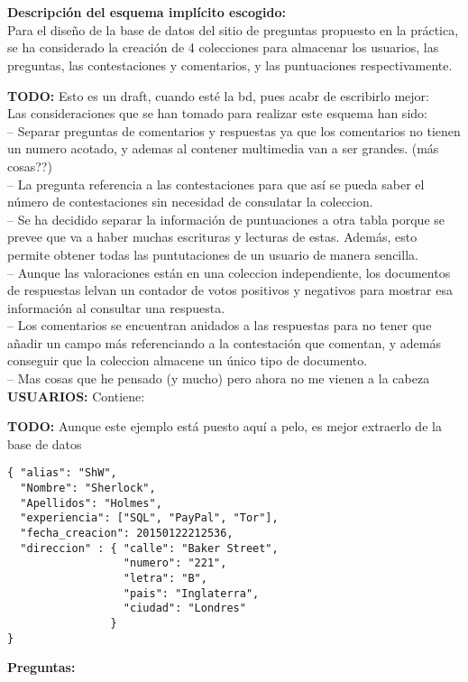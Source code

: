 \documentclass[11pt,a4paper]{article}
\newcommand{\todo}[1]{{\large \color{red} \textbf{TODO: }#1 }}
\begin{document}
 
\pagestyle{fancy}
\fancyhf{}
\rfoot{\thepage\ / \pageref{LastPage}}
\renewcommand{\headrulewidth}{0.4pt}
\renewcommand{\footrulewidth}{0.4pt}
\section*{}

\textbf{Descripción del esquema implícito escogido:}\\

Para el diseño de la base de datos del sitio de preguntas propuesto en la
práctica, se ha considerado la creación de 4 colecciones para almacenar los
usuarios, las preguntas, las contestaciones y comentarios, y las
puntuaciones respectivamente.

\todo{Esto es un draft, cuando esté la bd, pues acabr de escribirlo
  mejor:}\\


Las consideraciones que se han tomado para realizar este esquema han sido:\\

-- Separar preguntas de comentarios y respuestas ya que los comentarios no
tienen un numero acotado, y ademas al contener multimedia van a ser
grandes. (más cosas??)\\
-- La pregunta referencia a las contestaciones para que así se pueda saber
el número de contestaciones sin necesidad de consulatar la coleccion.\\
-- Se ha decidido separar la información de puntuaciones a otra tabla
porque se prevee que va a haber muchas escrituras y lecturas de
estas. Además, esto permite obtener todas las puntutaciones de un usuario
de manera sencilla.\\
-- Aunque las valoraciones están en una coleccion independiente, los
documentos de respuestas lelvan un contador de votos positivos y negativos
para mostrar esa información al consultar una respuesta.\\
-- Los comentarios se encuentran anidados a las respuestas para no tener
que añadir un campo más referenciando a la contestación que comentan, y
además conseguir que la coleccion almacene un único tipo de documento.\\
-- Mas cosas que he pensado (y mucho) pero ahora no me vienen a la cabeza\\




\textbf{USUARIOS:} Contiene:

\todo{Aunque este ejemplo está puesto aquí a pelo, es mejor extraerlo de la
  base de datos}
\begin{lstlisting}
{ "alias": "ShW",
  "Nombre": "Sherlock",
  "Apellidos": "Holmes",
  "experiencia": ["SQL", "PayPal", "Tor"],
  "fecha_creacion": 20150122212536,
  "direccion" : { "calle": "Baker Street",
                  "numero": "221",
                  "letra": "B",
                  "pais": "Inglaterra",
                  "ciudad": "Londres"
                }
}
\end{lstlisting}

\textbf{Preguntas:}
\end{document}
